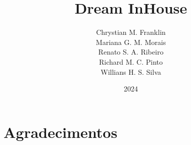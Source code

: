 \documentclass{article}
\title{{\Huge Dream InHouse}}
\author{
    Chrystian M. Franklin\\
    Mariana G. M. Morais\\
    Renato S. A. Ribeiro\\
    Richard M. C. Pinto\\
    Willians H. S. Silva
}
\date{2024}
\begin{document}
\maketitle
\pagebreak
\section*{Agradecimentos}
\pagebreak
\listoffigures
\pagebreak
\tableofcontents
\pagebreak

\pagebreak

\pagebreak

\pagebreak

\pagebreak

\pagebreak

\end{document}
